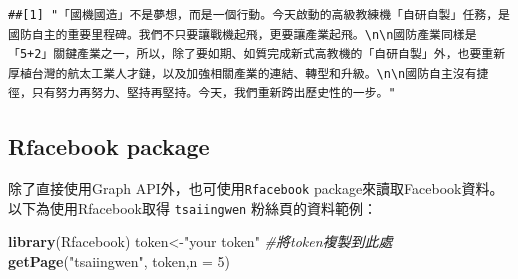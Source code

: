 \documentclass[]{book}
\newenvironment{Shaded}{\begin{snugshade}}{\end{snugshade}}
\newcommand{\KeywordTok}[1]{\textcolor[rgb]{0.13,0.29,0.53}{\textbf{{#1}}}}
\newcommand{\DataTypeTok}[1]{\textcolor[rgb]{0.13,0.29,0.53}{{#1}}}
\newcommand{\DecValTok}[1]{\textcolor[rgb]{0.00,0.00,0.81}{{#1}}}
\newcommand{\StringTok}[1]{\textcolor[rgb]{0.31,0.60,0.02}{{#1}}}
\newcommand{\CommentTok}[1]{\textcolor[rgb]{0.56,0.35,0.01}{\textit{{#1}}}}
\newcommand{\NormalTok}[1]{{#1}}
\theoremstyle{definition}
\theoremstyle{definition}
\theoremstyle{remark}
\begin{document}
\begin{verbatim}
##[1] "「國機國造」不是夢想，而是一個行動。今天啟動的高級教練機「自研自製」任務，是國防自主的重要里程碑。我們不只要讓戰機起飛，更要讓產業起飛。\n\n國防產業同樣是「5+2」關鍵產業之一，所以，除了要如期、如質完成新式高教機的「自研自製」外，也要重新厚植台灣的航太工業人才鏈，以及加強相關產業的連結、轉型和升級。\n\n國防自主沒有捷徑，只有努力再努力、堅持再堅持。今天，我們重新跨出歷史性的一步。"
\end{verbatim}

\subsection{Rfacebook package}\label{rfacebook-package}

除了直接使用Graph API外，也可使用\texttt{Rfacebook}\citep{R-Rfacebook}
package來讀取Facebook資料。 以下為使用Rfacebook取得 \texttt{tsaiingwen}
粉絲頁的資料範例：

\begin{Shaded}
\begin{Highlighting}[]
\KeywordTok{library}\NormalTok{(Rfacebook)}
\NormalTok{token<-}\StringTok{"your token"} \CommentTok{#將token複製到此處 }
\KeywordTok{getPage}\NormalTok{(}\StringTok{"tsaiingwen"}\NormalTok{, token,}\DataTypeTok{n =} \DecValTok{5}\NormalTok{)}
\end{Highlighting}
\end{Shaded}
\end{document}
